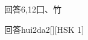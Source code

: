\begin{entry}{回答}{6,12}{⼞、⽵}
  \begin{phonetics}{回答}{hui2da2}[][HSK 1]
  \end{phonetics}
\end{entry}
